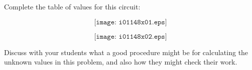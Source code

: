 

Complete the table of values for this circuit:

$$\texttt{[image: i01148x01.eps]}$$







$$\texttt{[image: i01148x02.eps]}$$







Discuss with your students what a good procedure might be for calculating the unknown values in this problem, and also how they might check their work.





